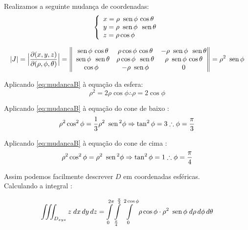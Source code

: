 \documentclass[12pt,a4paper]{article}
\newcommand{\sen}{\mbox{\, sen}\,}
\begin{document}
Realizamos a seguinte mudança de coordenadas:
\begin{equation}
\left\{\begin{array}{ll}
x=\rho\sen\phi\,\cos\theta\\
y= \rho\sen\phi\,\sen\theta\\
z = \rho\cos\phi
\end{array}\right.
\label{eq:mudancaB}
\end{equation}

\begin{equation}
|J| = \Big| \frac{\partial (x,y,z) }{\partial (\rho,\phi,\theta)} \Big| = \begin{Vmatrix}
\sen\phi\,\cos\theta &  \rho\cos\phi\,\cos\theta & -\rho\sen\phi\,\sen\theta \\
\sen\phi\,\sen\theta & \rho\cos\phi\,\sen\theta & \rho\sen\phi\,\cos\theta \\
\cos\phi & -\rho\sen\phi & 0 \\
\end{Vmatrix} = \rho^2\sen\phi
\label{eq:JacB}
\end{equation}

Aplicando \eqref{eq:mudancaB} \`a equaç\~{a}o da esfera:
\begin{equation}
\rho^2 = 2\rho\cos\phi \therefore \rho = 2\cos\phi
\label{eq:Q1_elipsoide}
\end{equation}

Aplicando \eqref{eq:mudancaB} \`a equaç\~{a}o do cone de baixo :
\begin{equation}
\rho^2\cos^2\phi = \frac{1}{3} \rho^ 2 \sen^2\phi \Rightarrow \tan^2 \phi = 3 \therefore \phi = \frac{\pi}{3}
\label{eq:coneB}
\end{equation}

Aplicando \eqref{eq:mudancaB} \`a equaç\~{a}o do cone de cima :
\begin{equation}
\rho^2\cos^2\phi =  \rho^ 2 \sen^2\phi \Rightarrow \tan^2 \phi = 1 \therefore \phi = \frac{\pi}{4}
\label{eq:cone2B}
\end{equation}


Assim podemos facilmente descrever $D$ em coordenadas esf\'{e}ricas. \\

Calculando a integral : \

$$ \iiint_{D_{xyz}}{z}\;dx\,dy\,dz  = \int\limits_{0}^{2\pi} \int\limits_{\frac{\pi}{4}}^{\frac{\pi}{3}}  \int\limits_{0}^{2\cos\phi} \rho \cos \phi \cdot \rho^2 \sen\phi \;d\rho\, d\phi\,d\theta $$
\end{document}
